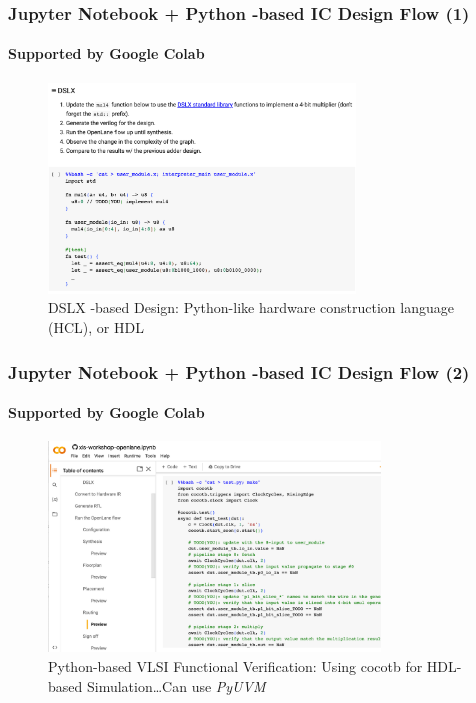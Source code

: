 \documentclass[xcolor={usenames,dvipsnames},hyperref={hyperindex,bookmarks}]{beamer}
\begin{document}
\begin{frame}
	\frametitle{Jupyter Notebook + Python -based IC Design Flow (1)}
	\framesubtitle{Supported by Google Colab}
	
	\begin{figure}
		\centering
		\includegraphics[height=2.2in]{./pics/JupyterNotebookICDesign1}
		\caption{DSLX -based Design: Python-like hardware construction language (HCL), or HDL}
	\end{figure}
\end{frame}







\begin{frame}
	\frametitle{Jupyter Notebook + Python -based IC Design Flow (2)}
	\framesubtitle{Supported by Google Colab}
	
	\begin{figure}
		\centering
		\includegraphics[height=2.2in]{./pics/JupyterNotebookICDesign2}
		\caption{Python-based VLSI Functional Verification: Using cocotb for HDL-based Simulation\dots Can use {\it PyUVM}}
	\end{figure}
\end{frame}
\end{document}
